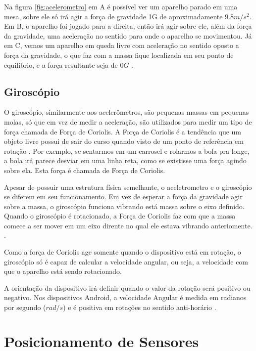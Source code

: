 	
Na figura \ref{fig:acelerometro} em A é possível ver um aparelho parado em uma mesa, sobre ele só irá agir a força de gravidade 1G de aproximadamente $9.8 m/s^{2}$. Em  B, o aparelho foi jogado para a direita, então irá agir sobre ele, além da força da gravidade, uma aceleração no sentido para onde o aparelho se movimentou. Já em C, vemos um aparelho em queda livre com aceleração no sentido oposto a força da gravidade, o que faz com a massa fique localizada em seu ponto de equilibrio, e a força resultante  seja de $0G$ \citep{milette2012professional}.


\subsection{Giroscópio}
	
	O giroscópio, similarmente aos acelerômetros, são pequenas massas em pequenas molas, só que em vez de medir a aceleração, são utilizados para medir um tipo de força chamada de Força de Coriolis. A Força de Coriolis é a tendência que um objeto livre possui de sair do curso quando visto de um ponto de referência em rotação \citep{milette2012professional}. Por exemplo, se sentarmos em um carrosel e rolarmos a bola pra longe, a bola irá parece desviar em uma linha reta, como se existisse uma força agindo sobre ela. Esta força é chamada de Força de Coriolis.
	
	Apesar de possuir uma estrutura física semelhante, o aceletrometro e o giroscópio se diferem em seu funcionamento. Em vez de esperar a força da gravidade agir sobre a massa, o giroscópio funciona vibrando está massa sobre o eixo definido. Quando o giroscópio é rotacionado, a Força de Coriolis faz com que a massa comece a ser mover em um eixo dirente no qual ele estava vibrando anteriomente.  \cite{milette2012professional}.
	
	Como a força de Coriolis age somente quando o dispositivo está em rotação, o giroscópio só é capaz de calcular a velocidade angular, ou seja, a velocidade com que o aparelho está sendo rotacionado. 
	
	A orientação da dispositivo irá definir quando o valor da rotação será positivo ou negativo. Nos dispositivos Android, a velocidade Angular é medida em radianos por segundo ($rad/s$) e é positiva em rotações no sentido anti-horário \citep{GyroscopeAndroidDocs}. 
	
\section{Posicionamento de Sensores}
\label{sec:sensor_position}

